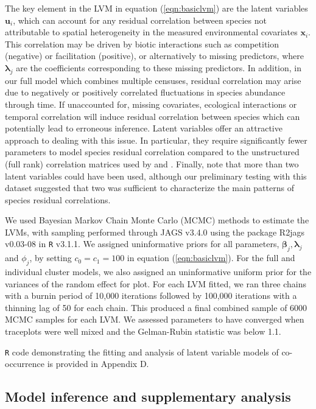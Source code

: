 The key element in the LVM in equation (\ref{eqn:basiclvm}) are the latent variables $\bm{u}_i$, which can account for any residual correlation between species not attributable to spatial heterogeneity in the measured environmental covariates $\bm{x}_i$. This correlation may be driven by biotic interactions such as competition (negative) or facilitation (positive), or alternatively to missing predictors, where $\bm{\lambda}_j$ are the coefficients corresponding to these missing predictors. In addition, in our full model which combines multiple censuses, residual correlation may arise due to negatively or positively correlated fluctuations in species abundance through time. If unaccounted for, missing covariates, ecological interactions or temporal correlation will induce residual correlation between species which can potentially lead to erroneous inference. Latent variables offer an attractive approach to dealing with this issue. In particular, they require significantly fewer parameters to model species residual correlation compared to the unstructured (full rank) correlation matrices used by \citet{Ovaskainen2010} and \citet{Pollock2014}. Finally, note that more than two latent variables could have been used, although our preliminary testing with this dataset suggested that two was sufficient to characterize the main patterns of species residual correlations. 

We used Bayesian Markov Chain Monte Carlo (MCMC) methods to estimate the LVMs, with sampling performed through JAGS v3.4.0 \citep{plummer2003jags} using the package R2jags v0.03-08 \citep{su2012r2jags} in \texttt{R} v3.1.1. We assigned uninformative priors for all parameters, $\bm{\beta}_j, \bm{\lambda}_j$ and $\phi_j$, by setting $c_0 = c_1 = 100$ in equation (\ref{eqn:basiclvm}). For the full and individual cluster models, we also assigned an uninformative uniform prior for the variances of the random effect for plot. For each LVM fitted, we ran three chains with a burnin period of 10,000 iterations followed by 100,000 iterations with a thinning lag of 50 for each chain. This produced a final combined sample of 6000 MCMC samples for each LVM. We assessed parameters to have converged when traceplots were well mixed and the Gelman-Rubin statistic was below 1.1.

\texttt{R} code demonstrating the fitting and analysis of latent variable models of co-occurrence is provided in Appendix D.

\subsection*{Model inference and supplementary analysis}

